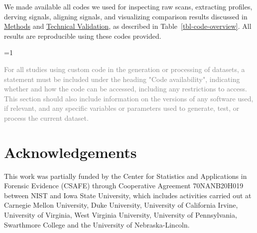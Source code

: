 \documentclass[fleqn,10pt]{wlscirep}
\newcommand{\ifinstruction}{0} %
\begin{document}
We made available all codes we used for inspecting raw scans, extracting
profiles, derving signals, aligning signals, and visualizing comparison
results discussed in \hyperref[sec-methods]{Methods} and
\hyperref[sec-technical-validation]{Technical Validation}, as described
in Table~\ref{tbl-code-overview}. All results are reproducible using
these codes provided.

\ifnum \ifinstruction=1

\textcolor{gray}{For all studies using custom code in the generation or processing of datasets, a statement must be included under the heading "Code availability", indicating whether and how the code can be accessed, including any restrictions to access. This section should also include information on the versions of any software used, if relevant, and any specific variables or parameters used to generate, test, or process the current dataset.}
\fi




\section*{Acknowledgements} 
This work was partially funded by the Center for Statistics and
Applications in Forensic Evidence (CSAFE) through Cooperative Agreement
70NANB20H019 between NIST and Iowa State University, which includes
activities carried out at Carnegie Mellon University, Duke University,
University of California Irvine, University of Virginia, West Virginia
University, University of Pennsylvania, Swarthmore College and the
University of Nebraska-Lincoln.
\end{document}
